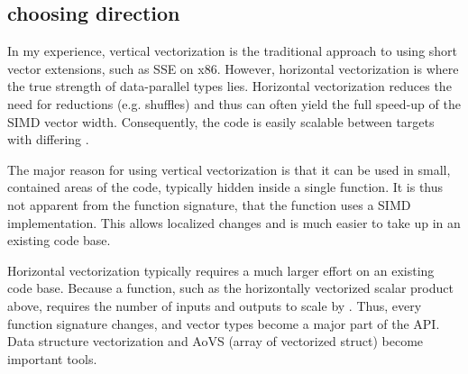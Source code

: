 \subsection{choosing direction}
  In my experience, vertical vectorization is the traditional approach to using short vector extensions, such as SSE on x86.
  However, horizontal vectorization is where the true strength of data-parallel types lies.
  Horizontal vectorization reduces the need for reductions (e.g. shuffles) and thus can often yield the full speed-up of the SIMD vector width.
  Consequently, the code is easily scalable between targets with differing .

  The major reason for using vertical vectorization is that it can be used in small, contained areas of the code, typically hidden inside a single function.
  It is thus not apparent from the function signature, that the function uses a SIMD implementation.
  This allows localized changes and is much easier to take up in an existing code base.

  Horizontal vectorization typically requires a much larger effort on an existing code base.
  Because a function, such as the horizontally vectorized scalar product above, requires the number of inputs and outputs to scale by .
  Thus, every function signature changes, and vector types become a major part of the API.
  Data structure vectorization and AoVS (array of vectorized struct) become important tools.

